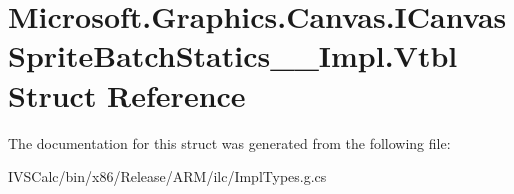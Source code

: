 \hypertarget{struct_microsoft_1_1_graphics_1_1_canvas_1_1_i_canvas_sprite_batch_statics_____impl_1_1_vtbl}{}\section{Microsoft.\+Graphics.\+Canvas.\+I\+Canvas\+Sprite\+Batch\+Statics\+\_\+\+\_\+\+Impl.\+Vtbl Struct Reference}
\label{struct_microsoft_1_1_graphics_1_1_canvas_1_1_i_canvas_sprite_batch_statics_____impl_1_1_vtbl}


The documentation for this struct was generated from the following file\+:\begin{DoxyCompactItemize}
\item 
I\+V\+S\+Calc/bin/x86/\+Release/\+A\+R\+M/ilc/Impl\+Types.\+g.\+cs\end{DoxyCompactItemize}
